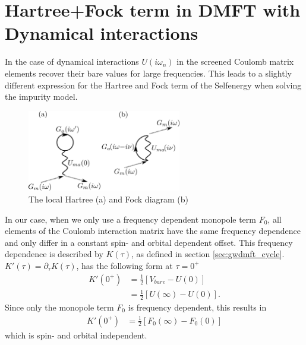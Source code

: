\documentclass[12pt,a4paper]{scrartcl}
\numberwithin{equation}{section}
\begin{document}
\section{Hartree+Fock term in DMFT with Dynamical interactions}
\label{sef:hartree_fock_freqdep}
In the case of dynamical interactions $U(i\omega_n)$ in 
the screened Coulomb matrix elements recover their bare values
for large frequencies. This leads to a slightly
different expression for the Hartree and Fock term of the Selfenergy when
solving the impurity model. 

\begin{figure}[t]
\begin{center}
\includegraphics[width=0.6\textwidth]{figs/hfdiag.pdf}
\end{center}
\caption{The local Hartree (a) and Fock diagram (b)}
\label{fig:1storder_diags}
\end{figure}

In our case, when we only use a frequency dependent monopole term $F_0$,
all elements of the Coulomb interaction matrix have the same frequency
dependence and only differ in a constant spin- and orbital
dependent offset. This frequency dependence is described by
$K(\tau)$, as defined in section \ref{sec:gwdmft_cycle}.
$K'(\tau) = \partial_{\tau} K(\tau)$, has the following form at $\tau=0^+$
\begin{align}
 K'(0^+)
 &= \frac{1}{2}\left[ V_{bare} - U(0) \right] \\
  &= \frac{1}{2}\left[ U(\infty) - U(0) \right].
\end{align}
Since only the monopole term $F_0$ is frequency
dependent, this results in 
\begin{align}
 K'(0^+)
 &= \frac{1}{2}\left[ F_0(\infty) - F_0(0) \right]
\end{align}
which is spin- and orbital independent.
\end{document}
